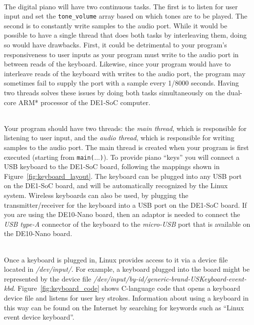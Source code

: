 \documentclass[epsfig,10pt,fullpage]{article}
\begin{document}
~\\
\noindent
The digital piano will have two continuous tasks. The first is to listen for user input 
and set the \texttt{tone\_volume} array based on which tones are to be played. The second is
to constantly write samples to the audio port. While it would be possible to
have a single thread that does both
tasks by interleaving them, doing so would have drawbacks. First, it could be detrimental to
your program's responsiveness to user inputs as your program must write to the audio port in
between reads of the keyboard. Likewise, since your program would have to interleave reads
of the keyboard with writes to the audio port, the program may sometimes fail 
to supply the port with a
sample every 1/8000 seconds. Having two threads solves these issues by doing both tasks
simultaneously on the dual-core ARM* processor of the DE1-SoC computer.

~\\
\noindent 
Your program should have two threads: the {\it main thread}, which is responsible 
for listening to user input, and the {\it audio thread}, which is responsible for writing 
samples to the audio port.
The main thread is created when your program is first executed (starting from
\texttt{main($\ldots$)}).
To provide piano ``keys'' you will connect a USB keyboard to the DE1-SoC board, following the
mappings shown in Figure~\ref{fig:keyboard_layout}. The keyboard can be plugged into any
USB port on the DE1-SoC board, and will be automatically recognized by the Linux system.
Wireless keyboards can also be used, by plugging the transmitter/receiver for the keyboard
into a USB port on the DE1-SoC board. If you are using the DE10-Nano board, then
an adaptor is needed to connect the {\it USB type-A} connector of the keyboard to the 
{\it micro-USB} port that is available on the DE10-Nano board. 

~\\
\noindent
Once a keyboard is plugged in, Linux provides access to it via a device file located in
\textit{/dev/input/}. For example, a keyboard plugged into the board might be represented by
the device file \textit{/dev/input/by-id/generic-brand-USKeyboard-event-kbd}. 
Figure~\ref{fig:keyboard_code} shows C-language code that opens a keyboard device file and
listens for user key strokes. Information about using a keyboard in this way can be found
on the Internet by searching for keywords such as ``Linux event device keyboard''.
\end{document}
